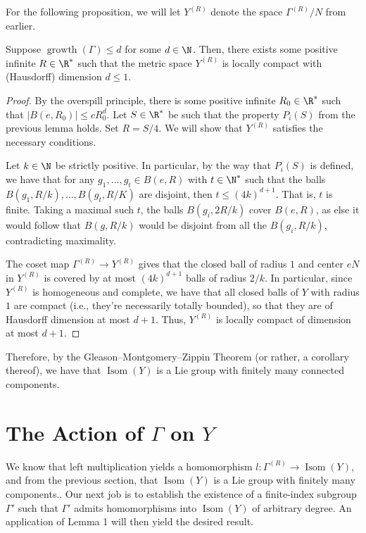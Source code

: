 \documentclass[10pt]{mypackage}
\begin{document}
For the following proposition, we will let $Y^{(R)}$ denote the space $\Gamma^{(R)}/N$ from earlier.
\begin{proposition}
  Suppose $\operatorname{growth}\left( \Gamma \right)\leq d$ for some $d\in \N$. Then, there exists some positive infinite $R\in \R^{\ast}$ such that the metric space $Y^{(R)}$ is locally compact with (Hausdorff) dimension $d\leq 1$.
\end{proposition}
\begin{proof}
  By the overspill principle, there is some positive infinite $R_0\in \R^{\ast}$ such that $\left\vert B\left( e,R_0 \right) \right\vert\leq cR_0^{d}$. Let $S\in \R^{\ast}$ be such that the property $P_i(S)$ from the previous lemma holds. Set $R = S/4$. We will show that $Y^{(R)}$ satisfies the necessary conditions.

  Let $k\in \N$ be strictly positive. In particular, by the way that $P_i(S)$ is defined, we have that for any $g_1,\dots,g_t\in B\left( e,R \right)$ with $t\in \N^{\ast}$ such that the balls $B\left( g_1,R/k \right),\dots,B\left( g_t,R/K \right)$ are disjoint, then $t\leq \left( 4k \right)^{d+1}$. That is, $t$ is finite. Taking a maximal such $t$, the balls $B\left( g_i,2R/k \right)$ cover $B\left( e,R \right)$, as else it would follow that $B\left( g,R/k \right)$ would be disjoint from all the $B\left( g_i,R/k \right)$, contradicting maximality.

  The coset map $\Gamma^{(R)}\to Y^{(R)}$ gives that the closed ball of radius $1$ and center $eN$ in $Y^{(R)}$ is covered by at most $\left( 4k \right)^{d+1}$ balls of radius $2/k$. In particular, since $Y^{(R)}$ is homogeneous and complete, we have that all closed balls of $Y$ with radius $1$ are compact (i.e., they're necessarily totally bounded), so that they are of Hausdorff dimension at most $d+1$. Thus, $Y^{(R)}$ is locally compact of dimension at most $d+1$.
\end{proof}
Therefore, by the Gleason--Montgomery--Zippin Theorem (or rather, a corollary thereof), we have that $\operatorname{Isom}\left( Y \right)$ is a Lie group with finitely many connected components.
\section{The Action of $\Gamma$ on $Y$}%
We know that left multiplication yields a homomorphism $l\colon \Gamma^{(R)}\to \operatorname{Isom}\left( Y \right)$, and from the previous section, that $\operatorname{Isom}\left( Y \right)$ is a Lie group with finitely many components.. Our next job is to establish the existence of a finite-index subgroup $\Gamma'$ such that $\Gamma'$ admits homomorphisms into $\operatorname{Isom}\left( Y \right)$ of arbitrary degree. An application of Lemma 1 will then yield the desired result.
\end{document}
